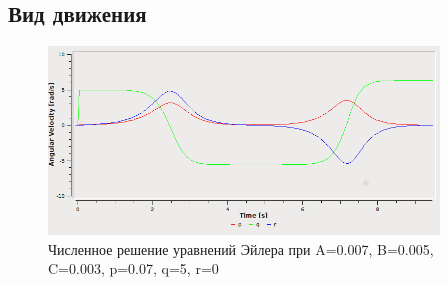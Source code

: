\documentclass{article}
\begin{document}
\subsection{Вид движения}
\begin{figure}[h]
\includegraphics[height=5cm]{pqr}
\caption{Численное решение уравнений Эйлера при A=0.007, B=0.005, C=0.003, p=0.07, q=5, r=0}
\end{figure}
\end{document}
